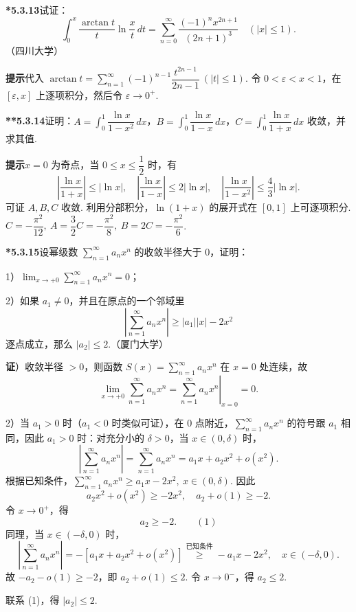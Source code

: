 \documentclass[UTF8,12pt,a4paper,fontset=fandol]{ctexart}
\begin{document}
\noindent\textbf{*5.3.13}\quad 试证：
\[
  \int_0^x\frac{\arctan t}{t}\ln\frac{x}{t}\,dt
  =\sum_{n=0}^{\infty}\frac{(-1)^nx^{2n+1}}{(2n+1)^3}\quad(|x|\le1).
\]
（四川大学）

\noindent\textbf{提示}\quad 代入 $\arctan t=\displaystyle\sum_{n=1}^{\infty}(-1)^{n-1}\dfrac{t^{2n-1}}{2n-1}\ (|t|\le1)$. 令 $0<\varepsilon<x<1$，在 $[\varepsilon,x]$ 上逐项积分，然后令 $\varepsilon\to0^+$.

\noindent\textbf{**5.3.14}\quad 证明：$A=\displaystyle\int_0^1\dfrac{\ln x}{1-x^2}\,dx$，$B=\displaystyle\int_0^1\dfrac{\ln x}{1-x}\,dx$，$C=\displaystyle\int_0^1\dfrac{\ln x}{1+x}\,dx$ 收敛，并求其值.

\noindent\textbf{提示}\quad $x=0$ 为奇点，当 $0\le x\le\dfrac12$ 时，有
\[
  \left|\frac{\ln x}{1+x}\right|\le|\ln x|,\quad
  \left|\frac{\ln x}{1-x}\right|\le2|\ln x|,\quad
  \left|\frac{\ln x}{1-x^2}\right|\le\frac43|\ln x|.
\]
可证 $A,B,C$ 收敛. 利用分部积分，$\ln(1+x)$ 的展开式在 $[0,1]$ 上可逐项积分.
$C=-\dfrac{\pi^2}{12},\ A=\dfrac32C=-\dfrac{\pi^2}{8},\ B=2C=-\dfrac{\pi^2}{6}$.

\noindent\textbf{*5.3.15}\quad 设幂级数 $\displaystyle\sum_{n=1}^{\infty}a_nx^n$ 的收敛半径大于 0，证明：

1）$\displaystyle\lim_{x\to+0}\sum_{n=1}^{\infty}a_nx^n=0$；

2）如果 $a_1\ne0$，并且在原点的一个邻域里
\[
  \left|\sum_{n=1}^{\infty}a_nx^n\right|\ge |a_1||x|-2x^2
\]
逐点成立，那么 $|a_2|\le2$.（厦门大学）

\noindent\textbf{证}）收敛半径 $>0$，则函数 $S(x)=\displaystyle\sum_{n=1}^{\infty}a_nx^n$ 在 $x=0$ 处连续，故
\[
  \lim_{x\to+0}\sum_{n=1}^{\infty}a_nx^n
  =\left.\sum_{n=1}^{\infty}a_nx^n\right|_{x=0}=0.
\]

2）当 $a_1>0$ 时（$a_1<0$ 时类似可证），在 0 点附近，$\displaystyle\sum_{n=1}^{\infty}a_nx^n$ 的符号跟 $a_1$ 相同，因此 $a_1>0$ 时：对充分小的 $\delta>0$，当 $x\in(0,\delta)$ 时，
\[
  \left|\sum_{n=1}^{\infty}a_nx^n\right|
  =\sum_{n=1}^{\infty}a_nx^n
  =a_1x+a_2x^2+o(x^2).
\]
根据已知条件，$\displaystyle\sum_{n=1}^{\infty}a_nx^n\ge a_1x-2x^2,\ x\in(0,\delta)$. 因此
\[
  a_2x^2+o(x^2)\ge-2x^2,\quad a_2+o(1)\ge-2.
\]
令 $x\to0^+$，得
\[
  a_2\ge-2. \qquad(1)
\]
同理，当 $x\in(-\delta,0)$ 时，
\[
  \left|\sum_{n=1}^{\infty}a_nx^n\right|
  =-\left[a_1x+a_2x^2+o(x^2)\right]
  \overset{\text{已知条件}}{\ge}-a_1x-2x^2,\quad x\in(-\delta,0).
\]
故 $-a_2-o(1)\ge-2$，即 $a_2+o(1)\le2$. 令 $x\to0^-$，得 $a_2\le2$.

联系 (1)，得 $|a_2|\le2$.
\end{document}
